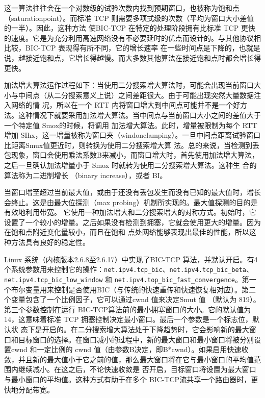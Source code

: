 这一算法往往会在一个对数级的试验次数内找到预期窗口，也被称为饱和点（saturationpoint）。而标准 TCP 则需要多项式级的次数（平均为窗口大小差值的一半）。因此，这种方法
使BIC-TCP 在特定的处理阶段拥有比标准 TCP 更快的速度。它是为充分利用高速网络没有不必要延时的优点而设计的。与其他协议相比较，BIC-TCP 表现得有所不同，它的增长速率
在一些时间点是下降的，也就是说，越接近饱和点，它增长得越慢。而大多数其他算法在接近饱和点时都会增长得更快。

加法增大算法运作过程如下：当使用二分搜索增大算法时，可能会出现当前窗口大小与中间点（从二分搜索意义上说）之间差距很大。由于可能出现突然大量数据注入网络的情
况，所以在一个 RTT 内将窗口增大到中间点可能并不是一个好方法。这种情况下就要采用加法增大算法。当中间点与当前窗口大小之间的差值大于一个特定值 Smox的时候，将调用
加法增大算法。此时，增量被限制为每个 RTT增加 SIhx，这一增量被称为窗口夹（windonclamping）。一旦中间点距离试验窗口比距离Smux值更近时，则转换为使用二分搜索增大算
法。总的来说，当检测到丢包现象，窗口会使用乘法系数B来减小，而窗口增大时，首先使用加法增大算法，之后一旦确认加法增量小于 Smox 时就转为使用二分搜索增大算法。这种生
合的算法称为二进制增长 （binary increase），或者 BI。

当窗口增至超过当前最大值，或由于还没有丢包发生而没有已知的最大值时，增长会终止。这是由最大位探测（max probing）机制所实现的。最大值探测的目的是有效地利用带宽。
它使用一种加法增大和二分搜索增大的对称方式。初始时，它设置了一个较小的增量。之后如果没有检测到拥塞，它就会使用更大的增量。因为在饱和点附近变化量较小，而且在饱和
点处网络能够表现出最佳的性能，所以这种方法具有良好的稳定性。

Linux 系统（内核版本2.6.8至2.6.17）中实现了BIC-TCP 算法，并默认开启。有4个系统参数用来控制它的操作：\verb|net.ipv4.tcp_bic|、\verb|net.ipv4.tcp_bic_beta|、\verb|net.ipv4.tcp_bic_low_window|
和 \verb|net.ipv4.top_bic_fast_convergence|。第一个布尔变量用来控制是否使用BIC（与传统的快速重传和快速恢复相对应）。第二个变量包含了一个比例因子，它可以通过cwnd 值来决定Smut 值
（默认为 819）。第三个参数控制在运行 BIC-TCP算法前的最小拥塞窗口的大小。它的默认值为14，这意味着标准 TCP 拥塞控制决定最小窗口。最后一个参数是一个标志位，默认状
态下是开启的。在二分搜索增大算法处于下降趋势时，它会影响新的最大窗口和目标窗口的选择。在窗口减小的过程中，新的最大窗口和最小窗口将被分别设置cwnd 和一定比例的
cwnd 值（由参数B决定，即B*cwnd）。如果启用快速收敛，并且新的最大值小于它之前的值，那么最大窗口将在它与最小窗口的平均值范围内继续减小。在这之后，不论快速收敛是
否开启，目标窗口将设置为最大窗口与最小窗口的平均值。这种方式有助于在多个 BIC-TCP流共享一个路由器时，更快地分配带宽。

